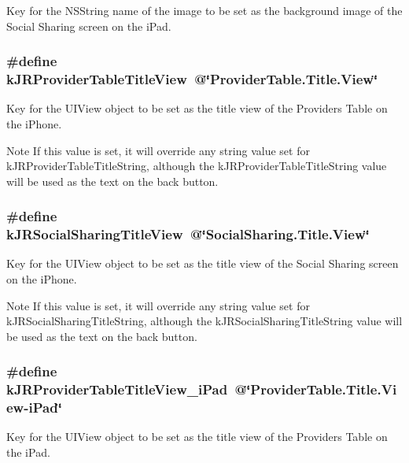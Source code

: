 \label{group__custom_interface_ga646cb35f3a7ec2835872ee6df2aceb76}
Key for the {\ttfamily NSString} name of the image to be set as the background image of the Social Sharing screen on the iPad. \hypertarget{group__custom_interface_ga0bce97edf43c9cdf53cbcd1aa92c4798}{
\subsubsection[{kJRProviderTableTitleView}]{\setlength{\rightskip}{0pt plus 5cm}\#define kJRProviderTableTitleView~@\char`\"{}ProviderTable.Title.View\char`\"{}}}
\label{group__custom_interface_ga0bce97edf43c9cdf53cbcd1aa92c4798}
Key for the {\ttfamily UIView} object to be set as the title view of the Providers Table on the iPhone.

\begin{DoxyNote}{Note}
If this value is set, it will override any string value set for kJRProviderTableTitleString, although the kJRProviderTableTitleString value will be used as the text on the back button. 
\end{DoxyNote}
\hypertarget{group__custom_interface_ga524965cf426f0eb9de4bcb804528c7f7}{
\subsubsection[{kJRSocialSharingTitleView}]{\setlength{\rightskip}{0pt plus 5cm}\#define kJRSocialSharingTitleView~@\char`\"{}SocialSharing.Title.View\char`\"{}}}
\label{group__custom_interface_ga524965cf426f0eb9de4bcb804528c7f7}
Key for the {\ttfamily UIView} object to be set as the title view of the Social Sharing screen on the iPhone.

\begin{DoxyNote}{Note}
If this value is set, it will override any string value set for kJRSocialSharingTitleString, although the kJRSocialSharingTitleString value will be used as the text on the back button. 
\end{DoxyNote}
\hypertarget{group__custom_interface_ga52c322e9fd2aa78cbd64d050f0fd5e41}{
\subsubsection[{kJRProviderTableTitleView\_\-iPad}]{\setlength{\rightskip}{0pt plus 5cm}\#define kJRProviderTableTitleView\_\-iPad~@\char`\"{}ProviderTable.Title.View-\/iPad\char`\"{}}}
\label{group__custom_interface_ga52c322e9fd2aa78cbd64d050f0fd5e41}
Key for the {\ttfamily UIView} object to be set as the title view of the Providers Table on the iPad.

